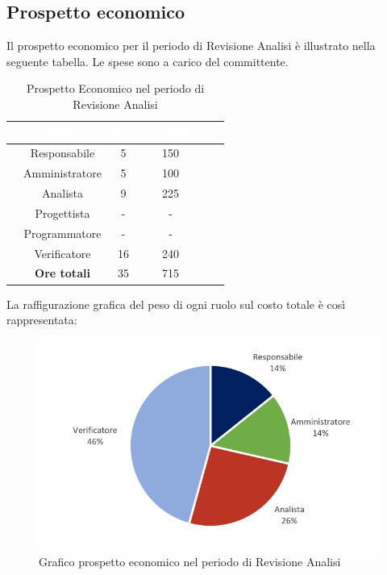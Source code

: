 \subsection{Prospetto economico}
Il prospetto economico per il periodo di Revisione Analisi è illustrato nella seguente tabella.
Le spese sono a carico del committente.
\begin{table}[ht]
	\begin{center}
		\begin{tabular}{cccccc}
			\rowcolor{coolblack}
			\hline
			&\textcolor{white}{Ruolo}&	\textcolor{white}{Ore} &\textcolor{white}{Costo(\euro)} \\
			\hline
			&Responsabile           &5&150  \\
			&Amministratore        & 5& 100 \\
			&Analista                   & 9& 225 \\
			&Progettista              &  -& - \\
			&Programmatore       & - & -  \\
			&Verificatore             & 16 & 240 \\
			\hline
			&\textbf{Ore totali}    &35& 715\\
		\end{tabular}
		\caption{Prospetto Economico nel periodo di Revisione Analisi }
	\end{center}
\end{table}

La raffigurazione grafica del peso di ogni ruolo sul costo totale è così rappresentata: 
\begin{figure}[!ht]
	\begin{center}
		\includegraphics{images/grafoProspettoEconomicoDett.png}
		\caption{Grafico prospetto economico nel periodo di Revisione Analisi}
	\end{center}
\end{figure}

